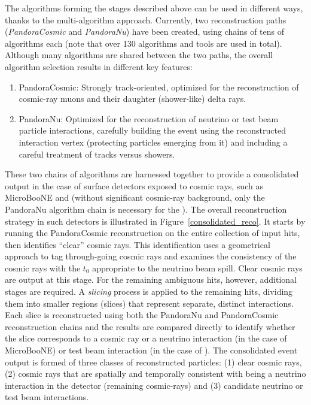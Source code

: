The algorithms forming the stages described above can be used in different ways, thanks to the multi-algorithm approach. Currently, two  reconstruction paths ({\it PandoraCosmic} and {\it PandoraNu}) have been created, using chains of tens of algorithms each (note that over 130 algorithms and tools are used in total). Although many algorithms are shared between the two paths, the overall algorithm selection results in different key features:
\begin{enumerate}
\item PandoraCosmic: Strongly track-oriented, optimized for the reconstruction of cosmic-ray muons and their daughter (shower-like) delta rays. 
\item PandoraNu: Optimized for the reconstruction of neutrino or test beam particle interactions, carefully building the event using the reconstructed interaction vertex (protecting particles emerging from it) and including a careful treatment of tracks versus showers. 
\end{enumerate}

These two chains of algorithms are harnessed together to provide a consolidated output in the case of surface detectors exposed to cosmic rays, such as MicroBooNE and  (without significant cosmic-ray background, only the PandoraNu algorithm chain is necessary for the ). The overall reconstruction strategy in such detectors is illustrated in Figure~\ref{consolidated_reco}. It starts by running the PandoraCosmic reconstruction on the entire collection of input hits, then identifies ``clear'' cosmic rays. This identification uses a geometrical approach to tag through-going cosmic rays and examines the consistency of the cosmic rays with the $t_{0}$ appropriate to the neutrino beam spill. Clear cosmic rays are output at this stage. For the remaining ambiguous hits, however, additional stages are required. A \textit{slicing} process is applied to the remaining hits, dividing them into smaller regions (slices) that represent separate, distinct interactions. Each slice is reconstructed using both the PandoraNu and PandoraCosmic reconstruction chains and the results are compared directly to identify whether the slice corresponds to a cosmic ray or a neutrino interaction (in the case of MicroBooNE) or test beam interaction (in the case of ). The consolidated event output is formed of three classes of reconstructed particles: (1) clear cosmic rays, (2) cosmic rays that are spatially and temporally consistent with being a neutrino interaction in the detector (remaining cosmic-rays) and (3) candidate neutrino or test beam interactions.

